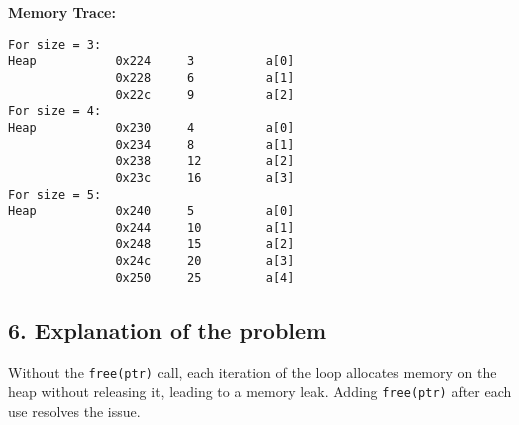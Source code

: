 \documentclass[12pt]{article}
\begin{document}
\textbf{Memory Trace:}
\begin{verbatim}
For size = 3:
Heap           0x224     3          a[0]
               0x228     6          a[1]
               0x22c     9          a[2]
For size = 4:
Heap           0x230     4          a[0]
               0x234     8          a[1]
               0x238     12         a[2]
               0x23c     16         a[3]
For size = 5:
Heap           0x240     5          a[0]
               0x244     10         a[1]
               0x248     15         a[2]
               0x24c     20         a[3]
               0x250     25         a[4]
\end{verbatim}

\subsection*{6. Explanation of the problem}
Without the \texttt{free(ptr)} call, each iteration of the loop allocates memory on the heap without releasing it, leading to a memory leak. Adding \texttt{free(ptr)} after each use resolves the issue.
\end{document}
